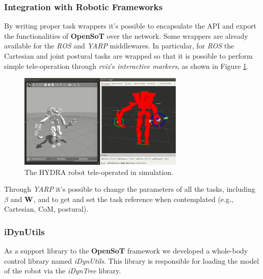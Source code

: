 \subsubsection{Integration with Robotic Frameworks}
\label{sec:integration_with_robotic_frameworks}
By writing proper task wrappers it's possible to encapsulate the API and export the functionalities of \textbf{OpenSoT} over the network. Some wrappers are already available for the \emph{ROS} and \emph{YARP} middlewares. In particular, for \emph{ROS} the Cartesian and joint postural tasks are wrapped so that it is possible to perform simple tele-operation  through \emph{rviz}'s \emph{interactive markers}, as shown in Figure \ref{opensot_interactive_markers}.
\begin{figure}[!ht]
\vspace{2 mm}
\centering
\includegraphics[width=0.7\textwidth]{images/software/hydra_tele_operation.eps}
\caption{The HYDRA robot tele-operated in simulation.}
\label{opensot_interactive_markers}
\end{figure}
Through \emph{YARP} it's possible to change the parameters of all the tasks, including $\beta$ and $\mathbf{W}$, and to get and set the task reference when contemplated (e.g., Cartesian, CoM, postural).

\subsubsection{iDynUtils}
\label{sec:idynutils}

As a support library to the \textbf{OpenSoT} framework we developed a whole-body control library named \emph{iDynUtils}.
This library is responsible for loading the model of the robot via the \emph{iDynTree}\cite{Nori2015-zb,Nori2015-db} library.


